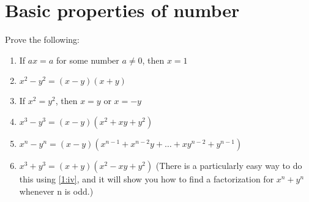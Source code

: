 \chapter{Basic properties of number}
\begin{pr} \label{1.1}
  Prove the following:
  \begin{enumerate}[label=(\roman*)]
    \item If $ax=a$ for some number $a\neq0$, then
    $x=1$
    \item $x^2-y^2=(x-y)(x+y)$
    \item If $x^2=y^2$, then $x=y$ or $x=-y$
    \item \label{1:iv}
    $x^3-y^3=(x-y)(x^2+xy+y^2)$
    \item \label{1.1:v}
    $x^n-y^n=(x-y)(x^{n-1}+x^{n-2}y+\dots+xy^{n-2}
    +y^{n-1})$
    \item \label{1.1:vi}
    $x^3+y^3=(x+y)(x^2-xy+y^2)$ (There is a particularly
    easy way to do this using \ref{1:iv}, and it will show
    you how to find a factorization for $x^n+y^n$ whenever
    n is odd.)
  \end{enumerate}
\end{pr}

